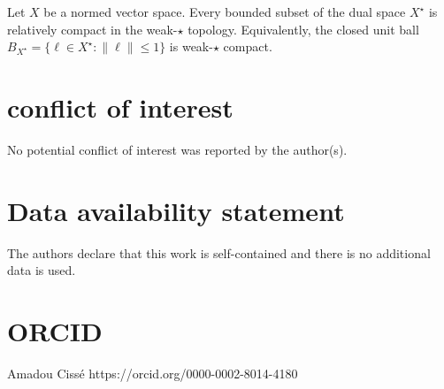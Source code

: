 \documentclass[AMA,Times2COL]{WileyNJDv5}
\begin{document}
\begin{theorem}
\label{thm:banach-alaoglu}
Let $X$ be a normed vector space. Every bounded subset of the dual space $X^{\star}$ is relatively compact in the weak-$\star$ topology. Equivalently, the closed unit ball
\(
B_{X^{\star}}
=
\{\ell\in X^{\star}:\|\ell\|\le 1\}
\)
is weak-$\star$ compact.
\end{theorem}

\section*{conflict of interest}
No potential conflict of interest was reported by the author(s).

\section*{Data availability statement}
The authors declare that this work is self-contained and there is no additional data is used.
\section*{ORCID}
Amadou Cissé https://orcid.org/0000-0002-8014-4180












\end{document}
